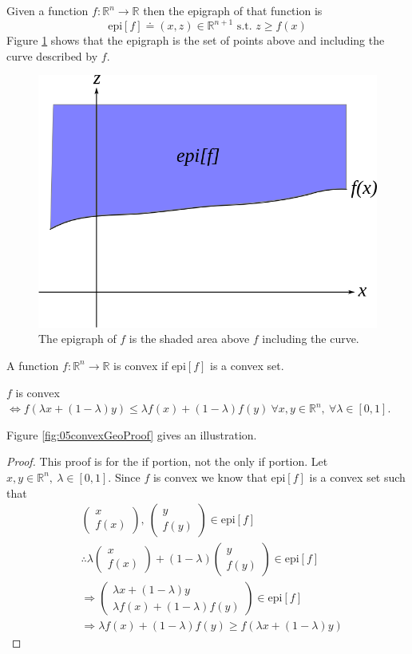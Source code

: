 \begin{definition}
Given a function $f:\mathbb{R}^n\to\mathbb{R}$ then the epigraph of that function is
$$\text{epi}[f] \doteq (x,z)\in\mathbb{R}^{n+1} \text{ s.t. } z\geq f(x)$$
Figure \ref{fig:05epigraph} shows that the epigraph is the set of points above and including the curve described by $f$.
\end{definition}

\begin{figure}[ht!]
	\centering
	\includegraphics[width=.4\textwidth]{images/05epigraph}
	\caption{The epigraph of $f$ is the shaded area above $f$ including the curve.}
	\label{fig:05epigraph}
\end{figure}

\begin{definition}
A function $f:\mathbb{R}^n\to\mathbb{R}$ is convex if $\text{epi}[f]$ is a convex set.
\end{definition}

\begin{theorem}
$f$ is convex $\Leftrightarrow f(\lambda x + (1-\lambda)y)\leq \lambda f(x) + (1-\lambda)f(y) ~\forall x,y\in\mathbb{R}^n, ~\forall \lambda\in[0,1]$.
\end{theorem}
Figure \ref{fig:05convexGeoProof} gives an illustration.
\begin{proof}
This proof is for the if portion, not the only if portion. Let $x,y\in\mathbb{R}^n, ~\lambda\in[0,1]$. Since $f$ is convex we know that $\text{epi}[f]$ is a convex set such that
\begin{align*}
&\left(\begin{array}{c} x \\ f(x) \end{array}\right), ~\left(\begin{array}{c} y \\ f(y) \end{array}\right) \in \text{epi}[f] \\
&\therefore \lambda\left(\begin{array}{c} x \\ f(x) \end{array}\right) + (1-\lambda)\left(\begin{array}{c} y \\ f(y) \end{array}\right) \in \text{epi}[f] \\
&\Rightarrow \left(\begin{array}{c} \lambda x+(1-\lambda)y \\ \lambda f(x) + (1-\lambda)f(y) \end{array}\right) \in \text{epi}[f] \\
&\Rightarrow \lambda f(x) + (1-\lambda)f(y) \geq f(\lambda x + (1-\lambda)y)
\end{align*}
\end{proof}


